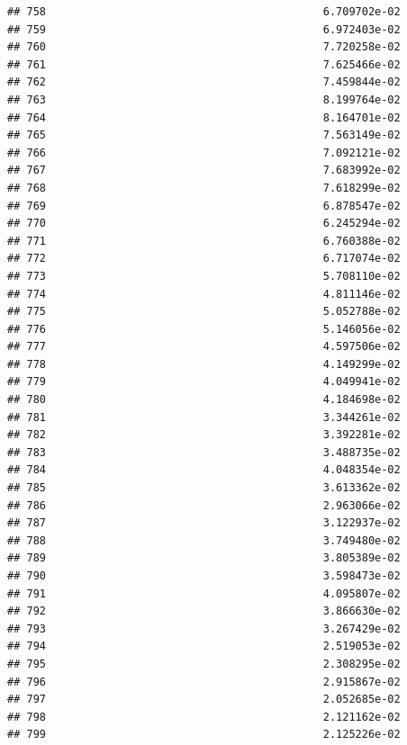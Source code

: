 \documentclass[
]{article}
\begin{document}
\begin{verbatim}
## 758                                           6.709702e-02
## 759                                           6.972403e-02
## 760                                           7.720258e-02
## 761                                           7.625466e-02
## 762                                           7.459844e-02
## 763                                           8.199764e-02
## 764                                           8.164701e-02
## 765                                           7.563149e-02
## 766                                           7.092121e-02
## 767                                           7.683992e-02
## 768                                           7.618299e-02
## 769                                           6.878547e-02
## 770                                           6.245294e-02
## 771                                           6.760388e-02
## 772                                           6.717074e-02
## 773                                           5.708110e-02
## 774                                           4.811146e-02
## 775                                           5.052788e-02
## 776                                           5.146056e-02
## 777                                           4.597506e-02
## 778                                           4.149299e-02
## 779                                           4.049941e-02
## 780                                           4.184698e-02
## 781                                           3.344261e-02
## 782                                           3.392281e-02
## 783                                           3.488735e-02
## 784                                           4.048354e-02
## 785                                           3.613362e-02
## 786                                           2.963066e-02
## 787                                           3.122937e-02
## 788                                           3.749480e-02
## 789                                           3.805389e-02
## 790                                           3.598473e-02
## 791                                           4.095807e-02
## 792                                           3.866630e-02
## 793                                           3.267429e-02
## 794                                           2.519053e-02
## 795                                           2.308295e-02
## 796                                           2.915867e-02
## 797                                           2.052685e-02
## 798                                           2.121162e-02
## 799                                           2.125226e-02

\end{verbatim}
\end{document}
